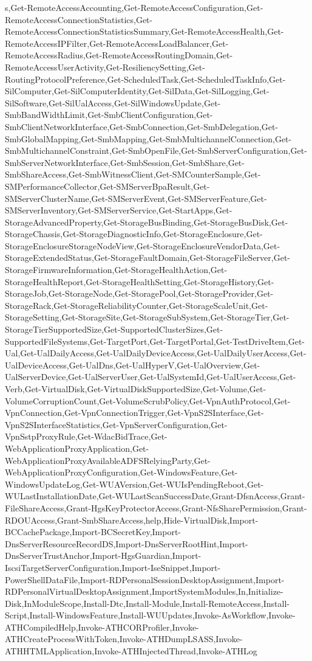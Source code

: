 {{s,Get-RemoteAccessAccounting,Get-RemoteAccessConfiguration,Get-RemoteAccessConnectionStatistics,Get-RemoteAccessConnectionStatisticsSummary,Get-RemoteAccessHealth,Get-RemoteAccessIPFilter,Get-RemoteAccessLoadBalancer,Get-RemoteAccessRadius,Get-RemoteAccessRoutingDomain,Get-RemoteAccessUserActivity,Get-ResiliencySetting,Get-RoutingProtocolPreference,Get-ScheduledTask,Get-ScheduledTaskInfo,Get-SilComputer,Get-SilComputerIdentity,Get-SilData,Get-SilLogging,Get-SilSoftware,Get-SilUalAccess,Get-SilWindowsUpdate,Get-SmbBandWidthLimit,Get-SmbClientConfiguration,Get-SmbClientNetworkInterface,Get-SmbConnection,Get-SmbDelegation,Get-SmbGlobalMapping,Get-SmbMapping,Get-SmbMultichannelConnection,Get-SmbMultichannelConstraint,Get-SmbOpenFile,Get-SmbServerConfiguration,Get-SmbServerNetworkInterface,Get-SmbSession,Get-SmbShare,Get-SmbShareAccess,Get-SmbWitnessClient,Get-SMCounterSample,Get-SMPerformanceCollector,Get-SMServerBpaResult,Get-SMServerClusterName,Get-SMServerEvent,Get-SMServerFeature,Get-SMServerInventory,Get-SMServerService,Get-StartApps,Get-StorageAdvancedProperty,Get-StorageBusBinding,Get-StorageBusDisk,Get-StorageChassis,Get-StorageDiagnosticInfo,Get-StorageEnclosure,Get-StorageEnclosureStorageNodeView,Get-StorageEnclosureVendorData,Get-StorageExtendedStatus,Get-StorageFaultDomain,Get-StorageFileServer,Get-StorageFirmwareInformation,Get-StorageHealthAction,Get-StorageHealthReport,Get-StorageHealthSetting,Get-StorageHistory,Get-StorageJob,Get-StorageNode,Get-StoragePool,Get-StorageProvider,Get-StorageRack,Get-StorageReliabilityCounter,Get-StorageScaleUnit,Get-StorageSetting,Get-StorageSite,Get-StorageSubSystem,Get-StorageTier,Get-StorageTierSupportedSize,Get-SupportedClusterSizes,Get-SupportedFileSystems,Get-TargetPort,Get-TargetPortal,Get-TestDriveItem,Get-Ual,Get-UalDailyAccess,Get-UalDailyDeviceAccess,Get-UalDailyUserAccess,Get-UalDeviceAccess,Get-UalDns,Get-UalHyperV,Get-UalOverview,Get-UalServerDevice,Get-UalServerUser,Get-UalSystemId,Get-UalUserAccess,Get-Verb,Get-VirtualDisk,Get-VirtualDiskSupportedSize,Get-Volume,Get-VolumeCorruptionCount,Get-VolumeScrubPolicy,Get-VpnAuthProtocol,Get-VpnConnection,Get-VpnConnectionTrigger,Get-VpnS2SInterface,Get-VpnS2SInterfaceStatistics,Get-VpnServerConfiguration,Get-VpnSstpProxyRule,Get-WdacBidTrace,Get-WebApplicationProxyApplication,Get-WebApplicationProxyAvailableADFSRelyingParty,Get-WebApplicationProxyConfiguration,Get-WindowsFeature,Get-WindowsUpdateLog,Get-WUAVersion,Get-WUIsPendingReboot,Get-WULastInstallationDate,Get-WULastScanSuccessDate,Grant-DfsnAccess,Grant-FileShareAccess,Grant-HgsKeyProtectorAccess,Grant-NfsSharePermission,Grant-RDOUAccess,Grant-SmbShareAccess,help,Hide-VirtualDisk,Import-BCCachePackage,Import-BCSecretKey,Import-DnsServerResourceRecordDS,Import-DnsServerRootHint,Import-DnsServerTrustAnchor,Import-HgsGuardian,Import-IscsiTargetServerConfiguration,Import-IseSnippet,Import-PowerShellDataFile,Import-RDPersonalSessionDesktopAssignment,Import-RDPersonalVirtualDesktopAssignment,ImportSystemModules,In,Initialize-Disk,InModuleScope,Install-Dtc,Install-Module,Install-RemoteAccess,Install-Script,Install-WindowsFeature,Install-WUUpdates,Invoke-AsWorkflow,Invoke-ATHCompiledHelp,Invoke-ATHCORProfiler,Invoke-ATHCreateProcessWithToken,Invoke-ATHDumpLSASS,Invoke-ATHHTMLApplication,Invoke-ATHInjectedThread,Invoke-ATHLog}}
